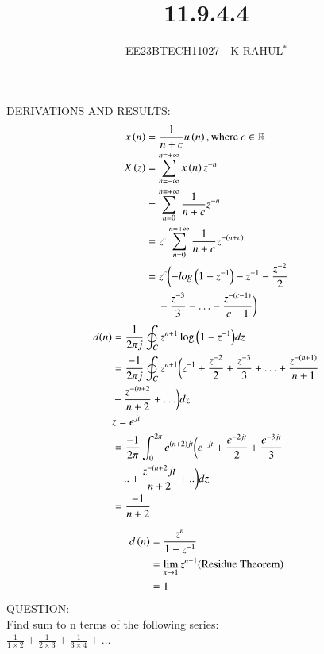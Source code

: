 \documentclass[journal,12pt,twocolumn]{IEEEtran}
\theoremstyle{remark}
\begin{document}

\vspace{3cm}
\title{11.9.4.4}
\author{EE23BTECH11027 - K RAHUL$^{*}$%
}
\maketitle
\newpage
\bigskip
\renewcommand{\thefigure}{\theenumi}
\renewcommand{\thetable}{\theenumi}
DERIVATIONS AND RESULTS: \\
\begin{align}
    x\left(n\right) &= \frac{1}{n+c} u\left(n\right),\text{where} \: c \in \mathbb{R}\\
    X\left(z\right) &= \sum_{n= -\infty}^{n= +\infty} x\left(n\right)z^{-n}\\
    &=\sum_{n = 0}^{n = +\infty} \frac{1}{n+c}z^{-n}\\
    &= z^c\sum_{n = 0}^{n = +\infty} \frac{1}{n+c}z^{-\left(n+c\right)}\\
    &= z^c \biggl(-log\left(1-z^{-1}\right)- z^{-1}-\frac{z^{-2}}{2}\notag \\& \;\;\;\;-\frac{z^{-3}}{3} - \ldots -\frac{z^{-(c-1)}}{c-1} \biggr)\label{11027_eq1}
\end{align}
\begin{align}
    d(n)&=\frac{1}{2\pi j} \oint _C z^{n+1}\log{\ensuremath{\left(1-z^{-1}\right)}}dz\\
    &=\frac{-1}{2\pi j} \oint _C z^{n+1}\biggl(z^{-1}+\frac{z^{-2}}{2} + \frac{z^{-3}}{3}+\ldots + \frac{z^{-(n+1)}}{n+1} \notag\\ \;\: &+  \frac{z^{-(n+2}}{n+2}+ \ldots \biggr) dz\\
    &z=e^{jt}\\
    &=\frac{-1}{2\pi} \int_{0}^{2\pi} e^{\left(n+2\right)jt}\biggl(e^{-jt}+\frac{e^{-2jt}}{2} + \frac{e^{-3jt}}{3} \notag \\&+.. +\frac{z^{-(n+2}jt}{n+2}+..\biggr) dz\\
    &=\frac{-1}{n+2}\label{11027_eq2}
\end{align}

\begin{align}
    d\left(n\right)&= \frac{z^n}{1-z^{-1}}\\
    &= \lim_{x \to 1}z^{n+1} \text{(Residue Theorem)}\\
    &= 1\label{11027_eq3}
\end{align}
\bigskip
QUESTION:\\
Find sum to n terms of the following series:\\
$\frac{1}{1 \times 2} + \frac{1}{2 \times 3} + \frac{1}{3 \times 4} + \ldots$
\bigskip \bigskip
\end{document}
